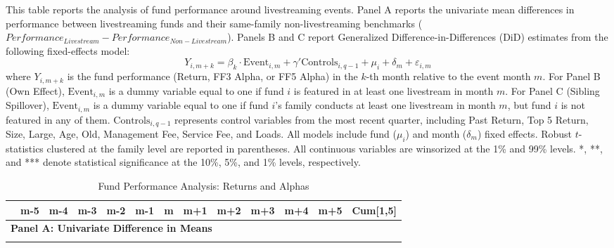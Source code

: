 \begin{landscape}

  \begin{table}[!ht]
    \caption{Fund Performance Analysis: Returns and Alphas}\label{tab:fund_performance}
    \footnotesize{
    This table reports the analysis of fund performance around livestreaming events. Panel A reports the univariate mean differences in performance between livestreaming funds and their same-family non-livestreaming benchmarks ($Performance_{Livestream} - Performance_{Non-Livestream}$). Panels B and C report Generalized Difference-in-Differences (DiD) estimates from the following fixed-effects model:
    \[ Y_{i,m+k} = \beta_k \cdot \text{Event}_{i,m} + \gamma' \text{Controls}_{i,q-1} + \mu_i + \delta_m + \varepsilon_{i,m} \]
    where $Y_{i,m+k}$ is the fund performance (Return, FF3 Alpha, or FF5 Alpha) in the $k$-th month relative to the event month $m$. For Panel B (Own Effect), $\text{Event}_{i,m}$ is a dummy variable equal to one if fund $i$ is featured in at least one livestream in month $m$. For Panel C (Sibling Spillover), $\text{Event}_{i,m}$ is a dummy variable equal to one if fund $i$'s family conducts at least one livestream in month $m$, but fund $i$ is not featured in any of them. $\text{Controls}_{i,q-1}$ represents control variables from the most recent quarter, including Past Return, Top 5 Return, Size, Large, Age, Old, Management Fee, Service Fee, and Loads. All models include fund ($\mu_i$) and month ($\delta_m$) fixed effects. Robust $t$-statistics clustered at the family level are reported in parentheses. All continuous variables are winsorized at the 1\% and 99\% levels. *, **, and *** denote statistical significance at the 10\%, 5\%, and 1\% levels, respectively.}

    \vspace{.1in}
    \centering

    \bgroup%
    \def\sym#1{\ifmmode^{#1}\else\(^{#1}\)\fi}
    \setlength{\tabcolsep}{4pt} %

    \small
    \renewcommand{\arraystretch}{0.84}%

    \begin{tabular}{l*{12}{c}}
        \toprule
        & m-5 & m-4 & m-3 & m-2 & m-1 & m & m+1 & m+2 & m+3 & m+4 & m+5 & Cum[1,5] \\
        \midrule
        
        \multicolumn{13}{l}{\textbf{Panel A\@: Univariate Difference in Means}} \\
        \midrule
        \\
        \midrule
        

\end{tabular}
\end{table}
\end{landscape}
